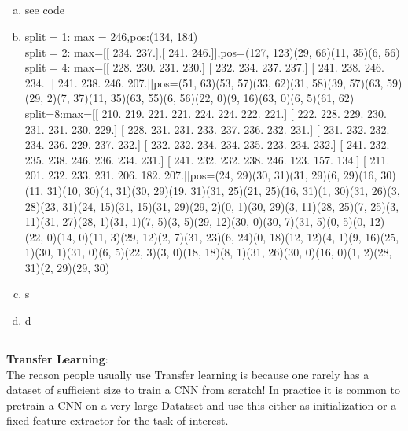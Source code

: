 \documentclass[12pt]{article}
\begin{document}
\subsection{ }
\begin{enumerate}[a)]
\item see code
\item split = 1: max = 246,pos:(134, 184)\\split = 2: max=[[ 234.  237.],[ 241.  246.]],pos=(127, 123)(29, 66)(11, 35)(6, 56)\\split = 4: max=[[ 228.  230.  231.  230.] [ 232.  234.  237.  237.] [ 241.  238.  246.  234.] [ 241.  238.  246.  207.]]pos=(51, 63)(53, 57)(33, 62)(31, 58)(39, 57)(63, 59)(29, 2)(7, 37)(11, 35)(63, 55)(6, 56)(22, 0)(9, 16)(63, 0)(6, 5)(61, 62)\\split=8:max=[[ 210.  219.  221.  221.  224.  224.  222.  221.] [ 222.  228.  229.  230.  231.  231.  230.  229.] [ 228.  231.  231.  233.  237.  236.  232.  231.] [ 231.  232.  232.  234.  236.  229.  237.  232.] [ 232.  232.  234.  234.  235.  223.  234.  232.] [ 241.  232.  235.  238.  246.  236.  234.  231.] [ 241.  232.  232.  238.  246.  123.  157.  134.] [ 211.  201.  232.  233.  231.  206.  182.  207.]]pos=(24, 29)(30, 31)(31, 29)(6, 29)(16, 30)(11, 31)(10, 30)(4, 31)(30, 29)(19, 31)(31, 25)(21, 25)(16, 31)(1, 30)(31, 26)(3, 28)(23, 31)(24, 15)(31, 15)(31, 29)(29, 2)(0, 1)(30, 29)(3, 11)(28, 25)(7, 25)(3, 11)(31, 27)(28, 1)(31, 1)(7, 5)(3, 5)(29, 12)(30, 0)(30, 7)(31, 5)(0, 5)(0, 12)(22, 0)(14, 0)(11, 3)(29, 12)(2, 7)(31, 23)(6, 24)(0, 18)(12, 12)(4, 1)(9, 16)(25, 1)(30, 1)(31, 0)(6, 5)(22, 3)(3, 0)(18, 18)(8, 1)(31, 26)(30, 0)(16, 0)(1, 2)(28, 31)(2, 29)(29, 30)
 \item s
\item d
\end{enumerate}


\subsection{ }

\textbf{Transfer Learning}:\\
The reason people usually use Transfer learning is because one rarely has a dataset of sufficient size to train a CNN from scratch! In practice it is common to pretrain a CNN on a very large Datatset and use this either as initialization or a fixed feature extractor for the task of interest.


\end{document}
